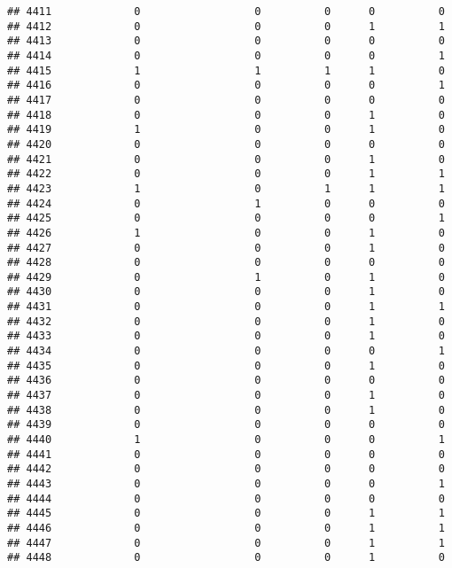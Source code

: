 \documentclass[
]{article}
\begin{document}
\begin{verbatim}
## 4411             0                  0          0      0          0
## 4412             0                  0          0      1          1
## 4413             0                  0          0      0          0
## 4414             0                  0          0      0          1
## 4415             1                  1          1      1          0
## 4416             0                  0          0      0          1
## 4417             0                  0          0      0          0
## 4418             0                  0          0      1          0
## 4419             1                  0          0      1          0
## 4420             0                  0          0      0          0
## 4421             0                  0          0      1          0
## 4422             0                  0          0      1          1
## 4423             1                  0          1      1          1
## 4424             0                  1          0      0          0
## 4425             0                  0          0      0          1
## 4426             1                  0          0      1          0
## 4427             0                  0          0      1          0
## 4428             0                  0          0      0          0
## 4429             0                  1          0      1          0
## 4430             0                  0          0      1          0
## 4431             0                  0          0      1          1
## 4432             0                  0          0      1          0
## 4433             0                  0          0      1          0
## 4434             0                  0          0      0          1
## 4435             0                  0          0      1          0
## 4436             0                  0          0      0          0
## 4437             0                  0          0      1          0
## 4438             0                  0          0      1          0
## 4439             0                  0          0      0          0
## 4440             1                  0          0      0          1
## 4441             0                  0          0      0          0
## 4442             0                  0          0      0          0
## 4443             0                  0          0      0          1
## 4444             0                  0          0      0          0
## 4445             0                  0          0      1          1
## 4446             0                  0          0      1          1
## 4447             0                  0          0      1          1
## 4448             0                  0          0      1          0

\end{verbatim}
\end{document}
